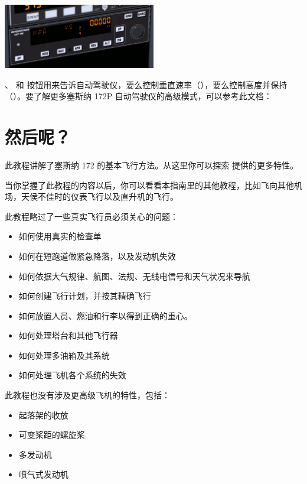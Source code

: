 \begin{itemize}
\begin{center}
\includegraphics[width=0.5\textwidth]{img/tut_51}
\end{center}

、 和  按钮用来告诉自动驾驶仪，要么控制垂直速率（\textcolor{orange}{}），要么控制高度并保持（\textcolor{orange}{}）。要了解更多塞斯纳 172P 自动驾驶仪的高级模式，可以参考此文档：

\section{然后呢？}
\label{sec:Poslowie}

此教程讲解了塞斯纳 172 的基本飞行方法。从这里你可以探索 \FlightGear{} 提供的更多特性。

当你掌握了此教程的内容以后，你可以看看本指南里的其他教程，比如飞向其他机场，天侯不佳时的仪表飞行以及直升机的飞行。

此教程略过了一些真实飞行员必须关心的问题：

\begin{itemize}
    \item 如何使用真实的检查单
    \item 如何在短跑道做紧急降落，以及发动机失效
    \item 如何依据大气规律、航图、法规、无线电信号和天气状况来导航
    \item 如何创建飞行计划，并按其精确飞行
    \item 如何放置人员、燃油和行李以得到正确的重心。
    \item 如何处理塔台和其他飞行器
    \item 如何处理多油箱及其系统
    \item 如何处理飞机各个系统的失效
\end{itemize}

此教程也没有涉及更高级飞机的特性，包括：

\begin{itemize}
  \item 起落架的收放
  \item 可变桨距的螺旋桨
  \item 多发动机
  \item 喷气式发动机
\end{itemize}


\end{itemize}
